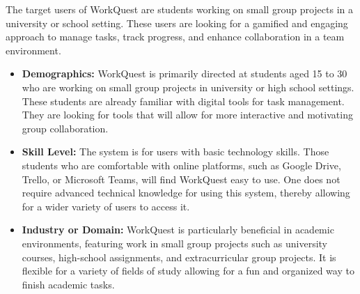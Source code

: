 The target users of WorkQuest are students working on small group projects in a university or school setting. These users are looking for a gamified and engaging approach to manage tasks, track progress, and enhance collaboration in a team environment.

\begin{itemize}  
    \item \textbf{Demographics:} WorkQuest is primarily directed at students aged 15 to 30 who are working on small group projects in university or high school settings. These students are already familiar with digital tools for task management. They are looking for tools that will allow for more interactive and motivating group collaboration. 
      
    \item \textbf{Skill Level:} The system is for users with basic technology skills. Those students who are comfortable with online platforms, such as Google Drive, Trello, or Microsoft Teams, will find WorkQuest easy to use. One does not require advanced technical knowledge for using this system, thereby allowing for a wider variety of users to access it. 
      
    \item \textbf{Industry or Domain:} WorkQuest is particularly beneficial in academic environments, featuring work in small group projects such as university courses, high-school assignments, and extracurricular group projects. It is flexible for a variety of fields of study allowing for a fun and organized way to finish academic tasks. 
\end{itemize}

